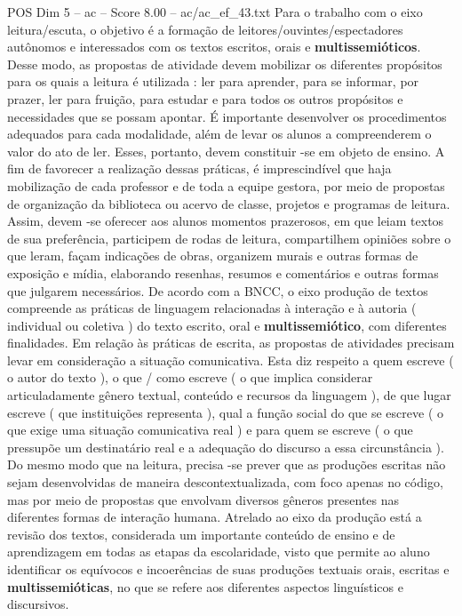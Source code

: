 \begin{textsample}{POS Dim 5 – ac – Score 8.00 – ac/ac\_ef\_43.txt}
Para o trabalho com o eixo leitura/escuta, o objetivo é a formação de leitores/ouvintes/espectadores autônomos e interessados com os textos escritos, orais e \textbf{multissemióticos}.
Desse modo, as propostas de atividade devem mobilizar os diferentes propósitos para os quais a leitura é utilizada : ler para aprender, para se informar, por prazer, ler para fruição, para estudar e para todos os outros propósitos e necessidades que se possam apontar.
É importante desenvolver os procedimentos adequados para cada modalidade, além de levar os alunos a compreenderem o valor do ato de ler.
Esses, portanto, devem constituir -se em objeto de ensino.
A fim de favorecer a realização dessas práticas, é imprescindível que haja mobilização de cada professor e de toda a equipe gestora, por meio de propostas de organização da biblioteca ou acervo de classe, projetos e programas de leitura.
Assim, devem -se oferecer aos alunos momentos prazerosos, em que leiam textos de sua preferência, participem de rodas de leitura, compartilhem opiniões sobre o que leram, façam indicações de obras, organizem murais e outras formas de exposição e mídia, elaborando resenhas, resumos e comentários e outras formas que julgarem necessários.
De acordo com a BNCC, o eixo produção de textos compreende as práticas de linguagem relacionadas à interação e à autoria ( individual ou coletiva ) do texto escrito, oral e \textbf{multissemiótico}, com diferentes finalidades.
Em relação às práticas de escrita, as propostas de atividades precisam levar em consideração a situação comunicativa.
Esta diz respeito a quem escreve ( o autor do texto ), o que / como escreve ( o que implica considerar articuladamente gênero textual, conteúdo e recursos da linguagem ), de que lugar escreve ( que instituições representa ), qual a função social do que se escreve ( o que exige uma situação comunicativa real ) e para quem se escreve ( o que pressupõe um destinatário real e a adequação do discurso a essa circunstância ).
Do mesmo modo que na leitura, precisa -se prever que as produções escritas não sejam desenvolvidas de maneira descontextualizada, com foco apenas no código, mas por meio de propostas que envolvam diversos gêneros presentes nas diferentes formas de interação humana.
Atrelado ao eixo da produção está a revisão dos textos, considerada um importante conteúdo de ensino e de aprendizagem em todas as etapas da escolaridade, visto que permite ao aluno identificar os equívocos e incoerências de suas produções textuais orais, escritas e \textbf{multissemióticas}, no que se refere aos diferentes aspectos linguísticos e discursivos.

\end{textsample}
